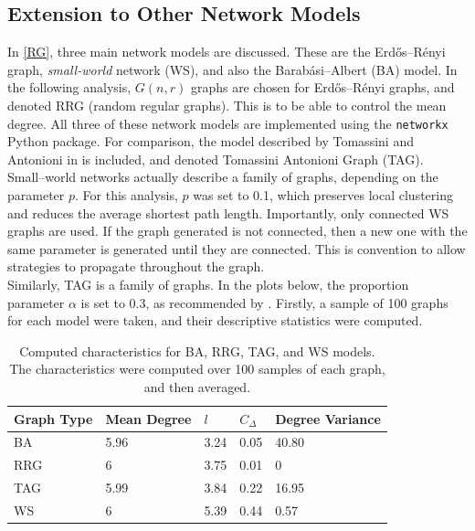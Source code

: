 \subsection{Extension to Other Network Models}

In \ref{RG}, three main network models are discussed. These are the Erd\H{o}s--R\'enyi graph, \emph{small-world} network (WS), and also the Barab\'{a}si--Albert (BA) model. In the following analysis, $G(n,r)$ graphs are chosen for Erd\H{o}s--R\'enyi graphs, and denoted RRG (random regular graphs). This is to be able to control the mean degree. All three of these network models are implemented using the \verb+networkx+ Python package. For comparison, the model described by Tomassini and Antonioni in \cite{RN51} is included, and denoted Tomassini Antonioni Graph (TAG). \\

Small--world networks actually describe a family of graphs, depending on the parameter $p$. For this analysis, $p$ was set to 0.1, which preserves local clustering and reduces the average shortest path length. Importantly, only connected WS graphs are used. If the graph generated is not connected, then a new one with the same parameter is generated until they are connected. This is convention to allow strategies to propagate throughout the graph. \\

Similarly, TAG is a family of graphs. In the plots below, the proportion parameter $\alpha$ is set to 0.3, as recommended by \cite{RN49}. Firstly, a sample of 100 graphs for each model were taken, and their descriptive statistics were computed. \\


\FloatBarrier

    

\begin{table}[!h]
\begin{center}
\begin{tabular}{|l|l|l|l|l|}
\hline
Graph Type & Mean Degree & $l$ & $C_\Delta$ & Degree Variance \\ \hline
BA         & 5.96        & 3.24                         & 0.05                   & 40.80           \\ \hline
RRG        & 6           & 3.75                         & 0.01                   & 0               \\ \hline
TAG        & 5.99        & 3.84                         & 0.22                   & 16.95           \\ \hline
WS         & 6           & 5.39                         & 0.44                   & 0.57            \\ \hline
\end{tabular}
\caption{Computed characteristics for BA, RRG, TAG, and WS models. The characteristics were computed over 100 samples of each graph, and then averaged. } \label{graph_stats}
\end{center}
\end{table}

